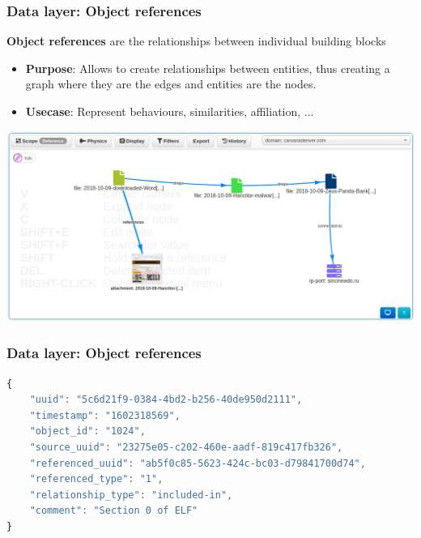 \begin{frame}[fragile]
    \frametitle{Data layer: Object references}
    {\bf Object references} are the relationships between individual building blocks
    \begin{itemize}
        \item[] \textbf{Purpose}: Allows to create relationships between entities, thus creating a graph where they are the edges and entities are the nodes.
        \item[] \textbf{Usecase}: Represent behaviours, similarities, affiliation, ...
    \end{itemize}
    \begin{center}
        \includegraphics[width=0.9\linewidth]{screenshots/eventgraph.png}
    \end{center}
\end{frame}

\begin{frame}[fragile]
    \frametitle{Data layer: Object references}
    \begin{lstlisting}[language=javascript,firstnumber=1]
{
    "uuid": "5c6d21f9-0384-4bd2-b256-40de950d2111",
    "timestamp": "1602318569",
    "object_id": "1024",
    "source_uuid": "23275e05-c202-460e-aadf-819c417fb326",
    "referenced_uuid": "ab5f0c85-5623-424c-bc03-d79841700d74",
    "referenced_type": "1",
    "relationship_type": "included-in",
    "comment": "Section 0 of ELF"
}
\end{lstlisting}
\end{frame}


